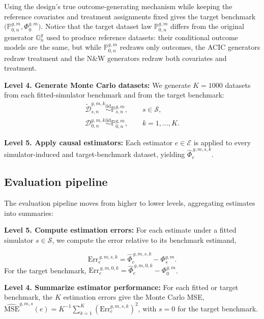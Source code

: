 Using the design's true outcome-generating mechanism while keeping the reference covariates and treatment assignments fixed gives the target benchmark \(\bigl(\mathbb P_{0,n}^{g,m},\Phi_0^{g,m}\bigr)\). Notice that the target dataset law \(\mathbb P_{0,n}^{g,m}\) differs from the original generator \(\mathbb G_n^{g}\) used to produce reference datasets: their conditional outcome models are the same, but while \(\mathbb P_{0,n}^{g,m}\) redraws only outcomes, the ACIC generators redraw treatment and the N\&W generators redraw both covariates and treatment.

\medskip
\noindent\textbf{Level 4. Generate Monte Carlo datasets:} We generate \(K=1000\) datasets from each fitted-simulator benchmark and from the target benchmark:
\[
\begin{gathered}
\widetilde{\mathcal D}_{s,n}^{g,m,k}
\overset{\mathrm{iid}}{\sim}\mathbb P_{s,n}^{g,m},
\qquad s\in\mathcal S,\\
\mathcal D_{0,n}^{g,m,k}
\overset{\mathrm{iid}}{\sim}\mathbb P_{0,n}^{g,m},
\qquad k=1,\dots,K.
\end{gathered}
\]

\medskip
\noindent\textbf{Level 5. Apply causal estimators:} Each estimator \(e\in\mathcal E\) is applied to every simulator-induced and target-benchmark dataset, yielding \(\widehat\Phi_{e}^{\,g,m,s,k}\).



\subsection{Evaluation pipeline}

The evaluation pipeline moves from higher to lower levels, aggregating estimates into summaries:

\medskip

\noindent\textbf{Level 5. Compute estimation errors:} For each estimate under a fitted simulator \(s\in\mathcal S\), we compute the error relative to its benchmark estimand,

\[
\mathrm{Err}_{e}^{\,g,m,s,k}
=
\widehat{\Phi}_{e}^{\,g,m,s,k}
-
\Phi_s^{g,m}.
\]
For the target benchmark, \(\mathrm{Err}_{e}^{\,g,m,0,k}=\widehat\Phi_{e}^{\,g,m,0,k}-\Phi_0^{g,m}\).

\medskip

\noindent\textbf{Level 4. Summarize estimator performance:} For each fitted or target benchmark, the \(K\) estimation errors give the Monte Carlo MSE, \(\widehat{\mathrm{MSE}}^{g,m,s}(e)=K^{-1}\sum_{k=1}^K(\mathrm{Err}_e^{g,m,s,k})^2\), with \(s=0\) for the target benchmark.

